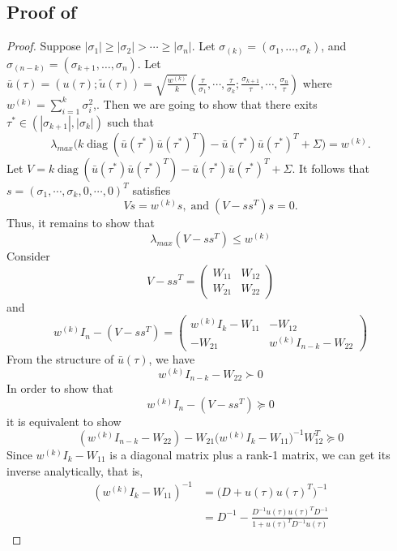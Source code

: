 \documentclass[11pt]{amsart}
\theoremstyle{plain}
\theoremstyle{definition}
\theoremstyle{remark}
\DeclareMathOperator{\diag}{diag}
\begin{document}
\begin{appendices}
		\subsection{Proof of }\label{append:lem_rank_one_case}
		\begin{proof}
			Suppose $|\sigma_1|\geq|\sigma_2|>\cdots\geq |\sigma_n|$. Let \(\sigma_{(k)} =(\sigma_1,\dots,\sigma_k)\), and \(\sigma_{(n-k)} =(\sigma_{k+1},\dots,\sigma_n)\). Let $\bar u(\tau) = (u(\tau);\tilde u(\tau))=\sqrt{\frac{w^{(k)}}{k}}(\frac{\tau}{\sigma_1},\cdots,\frac{\tau}{\sigma_k};\frac{\sigma_{k+1}}{\tau},\cdots,\frac{\sigma_{n}}{\tau})$ where $w^{(k)} = \sum_{i=1}^k\sigma_i^2$,. Then we are going to show that there exits $\tau^* \in (|\sigma_{k+1}|,|\sigma_{k}|)$ such that 
			\[
			\lambda_{max} \Big(k\diag(\bar u(\tau^*)\bar u(\tau^*)^T) - \bar u(\tau^*)\bar u(\tau^*)^T + \Sigma\Big) = w^{(k)}.
			\]
			Let $V = k\diag(\bar u(\tau^*)\bar u(\tau^*)^T) - \bar u(\tau^*)\bar u(\tau^*)^T + \Sigma$. It follows that $s = (\sigma_1,\cdots,\sigma_k,0,\cdots,0)^T$ satisfies
			\[
			Vs = w^{(k)}s, \; \text{and} \;(V - ss^T) s = 0.
			\]
			Thus, it remains to show that 
			\[
			\lambda_{max}(V - ss^T) \leq w^{(k)}
			\]
			Consider
			\[
			V  - ss^T = \begin{pmatrix}
				W_{11}&W_{12}\\
				W_{21}&W_{22}
			\end{pmatrix}
			\]
			and 
			\[
			w^{(k)} I_n - (V  - ss^T) = \begin{pmatrix}
				w^{(k)} I_k- W_{11}&-W_{12}\\
				-W_{21}& w^{(k)} I_{n-k} - W_{22}
			\end{pmatrix}
			\]
			From the structure of \(\bar u(\tau)\), we have
			\[
			w^{(k)} I_{n-k}- W_{22} \succ 0
			\]
			In order to show that
			\[
			w^{(k)} I_n - (V  - ss^T)\succeq 0  
			\]
			it is equivalent to show
			\begin{equation}\label{eq:lem_4_1}
			    (w^{(k)} I_{n-k}- W_{22}) - W_{21}\Big(w^{(k)} I_k - W_{11}\Big)^{-1}W_{12}^T\succeq 0
			\end{equation}
			Since $w^{(k)} I_k - W_{11}$ is a diagonal matrix plus a rank-1 matrix, we can get its inverse analytically, that is, 
			\begin{equation}
				\begin{split}
					(w^{(k)}I_k - W_{11})^{-1} &= \Big(D+u(\tau)u(\tau)^T\Big)^{-1}\\
					&= D^{-1} - \frac{D^{-1}u(\tau)u(\tau)^TD^{-1}}{1 + u(\tau)^TD^{-1}u(\tau)}

\end{split}
\end{equation}
\end{proof}
\end{appendices}
\end{document}
